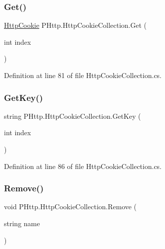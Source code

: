 \subsubsection{\texorpdfstring{Get()}{Get()}\hspace{0.1cm}{\footnotesize\ttfamily [2/2]}}
{\footnotesize\ttfamily \hyperlink{class_p_http_1_1_http_cookie}{Http\+Cookie} P\+Http.\+Http\+Cookie\+Collection.\+Get (\begin{DoxyParamCaption}\item[{int}]{index }\end{DoxyParamCaption})}



Definition at line 81 of file Http\+Cookie\+Collection.\+cs.

\mbox{\label{class_p_http_1_1_http_cookie_collection_a9e2ad64b08eb4cfccff9c3f78f4487fe}} 
\subsubsection{\texorpdfstring{Get\+Key()}{GetKey()}}
{\footnotesize\ttfamily string P\+Http.\+Http\+Cookie\+Collection.\+Get\+Key (\begin{DoxyParamCaption}\item[{int}]{index }\end{DoxyParamCaption})}



Definition at line 86 of file Http\+Cookie\+Collection.\+cs.

\mbox{\label{class_p_http_1_1_http_cookie_collection_ad005a9ec599ff421d16a43a67fedc2cf}} 
\subsubsection{\texorpdfstring{Remove()}{Remove()}}
{\footnotesize\ttfamily void P\+Http.\+Http\+Cookie\+Collection.\+Remove (\begin{DoxyParamCaption}\item[{string}]{name }\end{DoxyParamCaption})}



